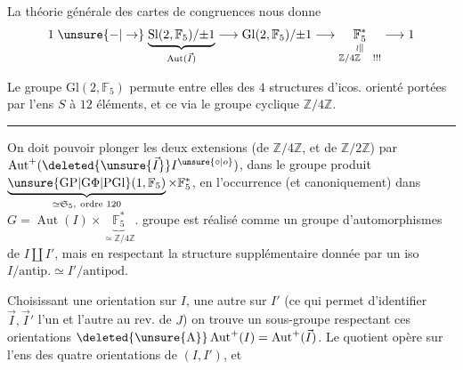 La théorie générale des cartes de congruences
nous donne
\[
1\mathrel{\unsure{-|\to}}\underbrace{\mathrm{Sl}(2,\mathbb F_5)/{\pm1}}_{\operatorname{Aut}(\vec I)}
\longrightarrow\mathrm{Gl}(2,\mathbb F_5)/{\pm1}
\longrightarrow\underset{\substack{\wr\Vert\\\mathbb Z/4\mathbb Z\quad!!!}}{\mathbb F_5^*}\longrightarrow1
\]

Le groupe $\mathrm{Gl}(2,\mathbb F_5)$ permute entre elles
 des $4$ structures d'icos. orienté
portées par l'ens $S$ à $12$ éléments, et
ce via le groupe cyclique $\mathbb Z/4\mathbb Z$.

\begin{center}\rule{1.5cm}{.6pt}\end{center}

On doit pouvoir plonger les deux extensions
(de $\mathbb Z/4\mathbb Z$, et de $\mathbb Z/2\mathbb Z$) par $\operatorname{Aut}^+(\deleted{\unsure{\vec I}}I^{\unsure{\circ|o}})$, dans le
groupe produit 
$\underbrace{\unsure{\mathrm{GP}|\mathrm{G}\Phi|\mathrm{PGl}}(1,\mathbb F_5)}_{\simeq\mathfrak S_5,\ \text{ordre }120}\times\mathbb F_5^*$, en
l'occurrence (et canoniquement) dans
 $G=\operatorname{Aut}(I)\times\underbrace{\mathbb F_5^*}_{\simeq\mathbb Z/4\mathbb Z}$.
 groupe est
réalisé comme un groupe d'automorphismes
de  
$I\amalg I'$, mais en
respectant la structure supplémentaire
donnée par un iso $I/\mathrm{antip.}\simeq I'/\mathrm{antipod.}$

Choisissant une orientation sur $I$, une autre
sur $I'$ (ce qui permet d'identifier $\vec I,\vec I'$ l'un
et l'autre au rev.  de $J$) on trouve
un sous-groupe respectant ces orientations
$\deleted{\unsure{\mathrm A}}\operatorname{Aut}^{+}(I)=\operatorname{Aut}^{+}(\vec I)$. Le quotient  opère
sur l'ens des quatre orientations de $(I,I')$, et 
